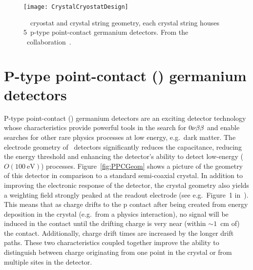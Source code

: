 		\begin{figure}
			\centering		
			\def\figheight{0.45\textheight}
			\texttt{[image: CrystalCryostatDesign]}
			\caption[\MJ~\minmod~cryostat and crystal string geometry]{\MJ~\minmod~cryostat and crystal string geometry, each
			crystal string houses 5~p-type point-contact germanium detectors.  From the \MJ~collaboration~\cite{MJCollaboration}.}
			\label{fig:MJEngDrawing1}
		\end{figure}

	
	\section{P-type point-contact (\ppc) germanium detectors}
	\label{sec:PPCDets}

  P-type point-contact (\ppc) germanium detectors are an exciting detector
technology whose characteristics provide powerful tools in the search for
$0 \nu \beta \beta$ and enable searches for other rare physics processes at low energy, e.g.~dark matter.  
The electrode geometry of \ppc~detectors significantly reduces the
capacitance, reducing the energy threshold and enhancing the detector's
ability to detect low-energy ($O(100~\text{eV})$) processes.  Figure~\ref{fig:PPCGeom} shows a picture of the geometry of this detector in comparison to a standard semi-coaxial crystal.  In addition to improving the electronic response of the detector, the crystal geometry also yields a weighting field strongly peaked at the readout electrode (see e.g.~Figure~1 in~\cite{Ren10}).  This means that as charge drifts to the p contact after being created from energy deposition in the crystal (e.g.~from a physics interaction), no signal will be induced in the contact until the drifting charge is very near (within $\sim1$~cm of) the contact.  Additionally, charge drift times are increased by the longer drift paths.  These two characteristics coupled together improve the ability to distinguish between charge originating from one point in the crystal or from multiple sites in the detector.

